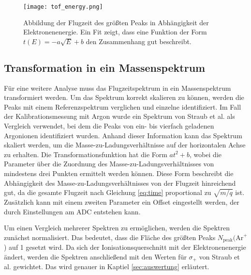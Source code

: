 \begin{figure}
    \centering
    \texttt{[image: tof\_energy.png]}
    \caption[Zusammenhang zwischen TOF und Elektronenenergie]{Abbildung der Flugzeit des größten Peaks in Abhängigkeit der Elektronenenergie. Ein Fit zeigt, dass eine Funktion der Form $t(E) = -a\sqrt{E} + b$ den Zusammenhang gut beschreibt.}
    \label{fig:tof_energy}
\end{figure}

\subsection{Transformation in ein Massenspektrum}
\label{sec:transformation}
Für eine weitere Analyse muss das Flugzeitspektrum in ein Massenspektrum transformiert werden. Um das Spektrum korrekt skalieren zu können, werden die Peaks mit einem Referenzspektrum verglichen und einzelne identifiziert. Im Fall der Kalibrationsmessung mit Argon wurde ein Spektrum von Straub et al. \cite{Straub} als Vergleich verwendet, bei dem die Peaks von ein- bis vierfach geladenen Argonionen identifiziert wurden. Anhand dieser Information kann das Spektrum skaliert werden, um die Masse-zu-Ladungsverhältnisse auf der horizontalen Achse zu erhalten. Die Transformationsfunktion hat die Form $at^2+b$, wobei die Parameter über die Zuordnung des Masse-zu-Ladungsverhältnisses von mindestens drei Punkten ermittelt werden können. Diese Form beschreibt die Abhängigkeit des Masse-zu-Ladungsverhältnisses von der Flugzeit hinreichend gut, da die gesamte Flugzeit nach Gleichung \ref{eq:time} proportional zu $\sqrt{m/q}$ ist. Zusätzlich kann mit einem zweiten Parameter ein Offset eingestellt werden, der durch Einstellungen am ADC entstehen kann. 

Um einen Vergleich mehrerer Spektren zu ermöglichen, werden die Spektren zunächst normalisiert. Das bedeutet, dass die Fläche des größten Peaks $N_\text{peak}(\text{Ar}^+$) auf 1 gesetzt wird. Da sich der Ionisationsquerschnitt mit der Elektronenenergie ändert, werden die Spektren anschließend mit den Werten für $\sigma_+$ von Straub et al. gewichtet. Das wird genauer in Kaptiel \ref{sec:auswertung} erläutert.

